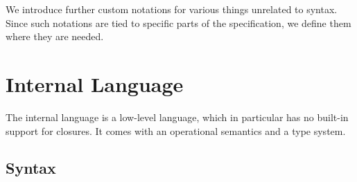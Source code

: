 \documentclass{scrartcl}
\begin{document}
We introduce further custom notations for various things unrelated to
syntax. Since such notations are tied to specific parts of the
specification, we define them where they are needed.

\section{Internal Language}

The internal language is a low-level language, which in particular has
no built-in support for closures. It comes with an operational semantics
and a type system.

\subsection{Syntax}
\end{document}
